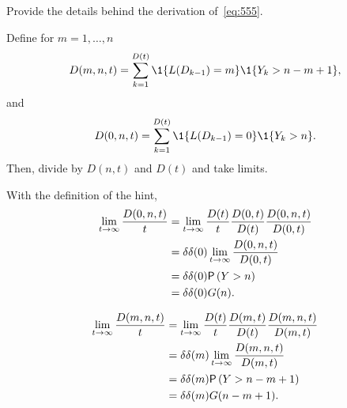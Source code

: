 \begin{exercise}
  Provide the details behind the derivation of~\cref{eq:555}.
\begin{hint}
Define for $m=1,\ldots, n$
\begin{equation*}
  D(m, n, t) = \sum_{k=1}^{D(t)}\1{L(D_{k-1})=m}\1{Y_k>n-m+1},
\end{equation*}
and 
\begin{equation*}
  D(0, n, t) = \sum_{k=1}^{D(t)}\1{L(D_{k-1})=0}\1{Y_k>n}.
\end{equation*}
Then, divide by $D(n,t)$ and $D(t)$ and take limits.
\end{hint}
\begin{solution}
With the definition of the hint, 
\begin{align*}
  \lim_{t\to\infty} \frac{  D(0, n, t)}t 
&=   \lim_{t\to\infty}  \frac{D(t)}t \frac{D(0, t)}{D(t)}\frac{ D(0, n, t)}{D(0,t)} \\
&=   \delta \delta(0) \lim_{t\to\infty} \frac{ D(0, n, t)}{D(0,t)} \\
&=   \delta \delta(0) \P{Y>n}\\
& = \delta \delta(0) G(n).
\end{align*}

\begin{align*}
  \lim_{t\to\infty} \frac{  D(m, n, t)}t 
&=   \lim_{t\to\infty}  \frac{D(t)}t \frac{D(m, t)}{D(t)}\frac{ D(m, n, t)}{D(m,t)} \\
&=   \delta \delta(m) \lim_{t\to\infty} \frac{ D(m, n, t)}{D(m,t)} \\
&=   \delta \delta(m) \P{Y>n-m+1}\\
& = \delta \delta(m) G(n-m+1).
\end{align*}
\end{solution}
\end{exercise}



